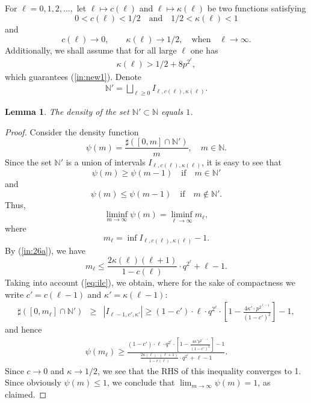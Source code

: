 \documentclass[11pt,twoside, reqno]{amsart}
\theoremstyle{plain}
\newtheorem{lema}{Lemma}
\theoremstyle{definition}
\newcommand{\N}{\mathbb{N}}
\begin{document}
\subsection{} For $\ell=0, 1, 2, \dots,$ let $\ell \mapsto c(\ell)$ and $\ell\mapsto \kappa(\ell)$ be two functions satisfying 
$$0<c(\ell)<1/2\quad\mbox{and}\quad  
1/2<\kappa(\ell)<1$$ 
and 
$$c(\ell)\to 0,\quad\mbox{}\quad \kappa(\ell)\to 1/2,\quad \mbox{when}\quad \ell\to \infty.$$ 
Additionally, we shall assume that for all large $\ell$ one has
\begin{eqnarray}\label{eq:30a}
\kappa(\ell)  >1/2 + 8p^{2^{\ell}},
\end{eqnarray}
which guarantees (\ref{in:new1}). %
Denote
\begin{eqnarray*}\label{eq:nprime}
\N'=\bigsqcup_{\ell\ge 0} I_{\ell, c(\ell), \kappa(\ell)}.
\end{eqnarray*}
\begin{lema}
The density of the set $\N'\subset \N$ equals $1$. 
\end{lema} 
\begin{proof} Consider the density function
$$
\psi(m) =\frac{ \sharp([0, m]\cap \N')}{m}, \quad m\in \N. 
$$
Since the set $\N'$ is a union of intervals $I_{\ell, c(\ell), \kappa(\ell)}$, it is easy to see that 
$$\psi(m)\ge \psi(m-1) \quad \mbox{if}\quad  m\in \N'$$
 and 
 $$\psi(m)\le  \psi(m-1) \quad \mbox{if}\quad  m\notin \N'.$$
 Thus, 
 $$\liminf_{m\to \infty} \psi(m) = \liminf_{\ell\to \infty} m_\ell,$$ where %
 $$m_\ell= \inf I_{\ell, c(\ell), \kappa(\ell)}-1. $$
By (\ref{in:26a}),
we have
$$
m_\ell\le  \frac{2\kappa(\ell) (\ell+1)}{1-c(\ell)}\cdot q^{2^{\ell}}+\ell -1.
$$ 
Taking into account (\ref{eq:ilc}), we obtain, where for the sake of compactness we write $c'=c(\ell-1)$ and $\kappa'=\kappa(\ell-1)$:
\begin{eqnarray*}
\sharp ([0, m_\ell]\cap \N') &\ge& |I_{\ell-1, c',\kappa'}|
\ge 
(1-c')\cdot \ell \cdot q^{2^{\ell}}\cdot \left[1-\frac{4\kappa'\cdot p^{2^{\ell-1}}}{(1-c')^2}\right]-1,\end{eqnarray*}
and hence
\begin{eqnarray*}
\psi(m_\ell) \ge \frac{(1-c')\cdot \ell \cdot q^{2^{\ell}}\cdot \left[1-\frac{4\kappa' p^{2^{\ell-1}}}{(1-c')^2}\right]-1}{\frac{2\kappa(\ell) \cdot (\ell+1)}{1-c(\ell)}\cdot q^{2^{\ell}}+\ell -1}.
\end{eqnarray*}
Since $c\to 0$ and $\kappa\to 1/2$, we see that the RHS of this inequality converges to 1. 
Since obviously $\psi(m)\le 1$, we conclude that $\lim_{m\to \infty} \psi(m)=1$, as claimed. 
\end{proof}
\end{document}
